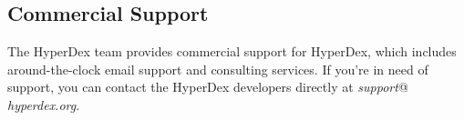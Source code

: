 \subsection{Commercial Support}
\label{sec:introduction:support:commercial}

The HyperDex team provides commercial support for HyperDex, which includes
around-the-clock email support and consulting services.  If you're in need of
support, you can contact the HyperDex developers directly at {\em support}@{\em
hyperdex.org}.
